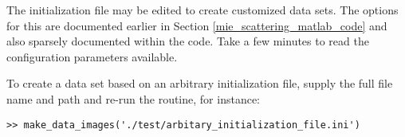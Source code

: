 The initialization file may be edited to create customized data sets.  The options for this are documented earlier in Section \ref{mie_scattering_matlab_code} and also sparsely documented within the code.  Take a few minutes to read the configuration parameters available.  

To create a data set based on an arbitrary initialization file, supply the full file name and path and re-run the routine, for instance:

\begin{verbatim}
>> make_data_images('./test/arbitary_initialization_file.ini')
\end{verbatim}
